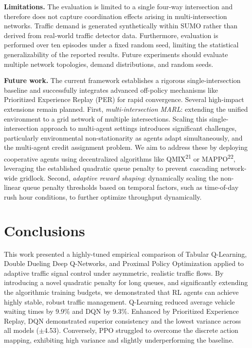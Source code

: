 \documentclass[10pt,a4paper]{article}
\begin{document}
\textbf{Limitations.}
The evaluation is limited to a single four-way intersection and therefore does not capture coordination effects arising in multi-intersection networks. Traffic demand is generated synthetically within SUMO rather than derived from real-world traffic detector data. Furthermore, evaluation is performed over ten episodes under a fixed random seed, limiting the statistical generalizability of the reported results. Future experiments should evaluate multiple network topologies, demand distributions, and random seeds.

\textbf{Future work.}
The current framework establishes a rigorous single-intersection baseline and successfully integrates advanced off-policy mechanisms like Prioritized Experience Replay (PER) for rapid convergence. Several high-impact extensions remain planned. First, \textit{multi-intersection MARL}: extending the unified environment to a grid network of multiple intersections. Scaling this single-intersection approach to multi-agent settings introduces significant challenges, particularly environmental non-stationarity as agents adapt simultaneously, and the multi-agent credit assignment problem. We aim to address these by deploying cooperative agents using decentralized algorithms like QMIX\textsuperscript{21} or MAPPO\textsuperscript{22}, leveraging the established quadratic queue penalty to prevent cascading network-wide gridlock. Second, \textit{adaptive reward shaping}: dynamically scaling the non-linear queue penalty thresholds based on temporal factors, such as time-of-day rush hour conditions, to further optimize throughput dynamically.

\section{Conclusions}

This work presented a highly-tuned empirical comparison of Tabular Q-Learning, Double Dueling Deep Q-Networks, and Proximal Policy Optimization applied to adaptive traffic signal control under asymmetric, realistic traffic flows. By introducing a novel quadratic penalty for long queues, and significantly extending the algorithmic training budgets, we demonstrated that RL agents can achieve highly stable, robust traffic management. Q-Learning reduced average vehicle waiting times by 9.9\% and DQN by 9.3\%. Enhanced by Prioritized Experience Replay, DQN demonstrated superior consistency and the lowest variance across all models ($\pm$4.53). Conversely, PPO struggled to overcome the discrete action mapping, exhibiting high variance and slightly underperforming the baseline.
\end{document}
